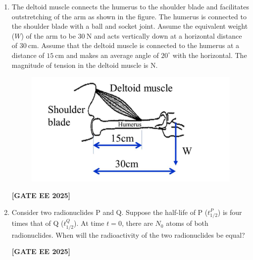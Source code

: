 \documentclass[journal]{IEEEtran}
\newcommand{\qfooter}{%
  \begin{flushright}\footnotesize\textbf{[GATE EE 2025]}\end{flushright}\vspace{1em}%
}
\begin{document}
\begin{enumerate}
\item The deltoid muscle connects the humerus to the shoulder blade and facilitates outstretching of the arm as shown in the figure. The humerus is connected to the shoulder blade with a ball and socket joint.  
Assume the equivalent weight ($W$) of the arm to be $30\ \text{N}$ and acts vertically down at a horizontal distance of $30\ \text{cm}$.  
Assume that the deltoid muscle is connected to the humerus at a distance of $15\ \text{cm}$ and makes an average angle of $20^\circ$ with the horizontal. The magnitude of tension in the deltoid muscle is N.

\begin{figure}[h]
\centering
\includegraphics[width=0.45\columnwidth]{figs/q45.png}
\end{figure}

\begin{enumerate}
\qfooter
\end{enumerate}

\item Consider two radionuclides P and Q. Suppose the half-life of P (\( t_{1/2}^P \)) is four times that of Q (\( t_{1/2}^Q \)). At time \( t = 0 \), there are \( N_0 \) atoms of both radionuclides. When will the radioactivity of the two radionuclides be equal?

\begin{enumerate}
\end{enumerate}
\qfooter


\end{enumerate}
\end{document}
